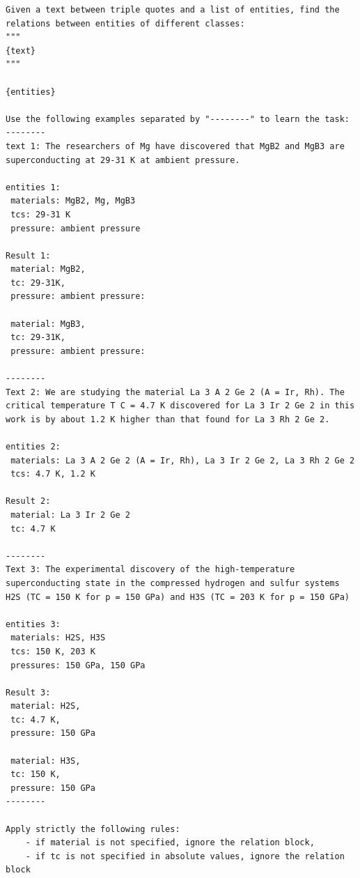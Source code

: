\begin{lstlisting}[caption=Few-shot prompting for extracting relations from lists of entities]
Given a text between triple quotes and a list of entities, find the relations between entities of different classes: 
"""
{text}
"""

{entities}
 
Use the following examples separated by "--------" to learn the task: 
--------
text 1: The researchers of Mg have discovered that MgB2 and MgB3 are superconducting at 29-31 K at ambient pressure.

entities 1:
 materials: MgB2, Mg, MgB3
 tcs: 29-31 K
 pressure: ambient pressure
 
Result 1: 
 material: MgB2, 
 tc: 29-31K, 
 pressure: ambient pressure:
 
 material: MgB3, 
 tc: 29-31K, 
 pressure: ambient pressure:

--------
Text 2: We are studying the material La 3 A 2 Ge 2 (A = Ir, Rh). The critical temperature T C = 4.7 K discovered for La 3 Ir 2 Ge 2 in this work is by about 1.2 K higher than that found for La 3 Rh 2 Ge 2.

entities 2:
 materials: La 3 A 2 Ge 2 (A = Ir, Rh), La 3 Ir 2 Ge 2, La 3 Rh 2 Ge 2
 tcs: 4.7 K, 1.2 K
 
Result 2: 
 material: La 3 Ir 2 Ge 2
 tc: 4.7 K

--------
Text 3: The experimental discovery of the high-temperature superconducting state in the compressed hydrogen and sulfur systems H2S (TC = 150 K for p = 150 GPa) and H3S (TC = 203 K for p = 150 GPa)

entities 3:
 materials: H2S, H3S
 tcs: 150 K, 203 K
 pressures: 150 GPa, 150 GPa
 
Result 3: 
 material: H2S,
 tc: 4.7 K,
 pressure: 150 GPa
 
 material: H3S,
 tc: 150 K,
 pressure: 150 GPa
--------

Apply strictly the following rules:  
    - if material is not specified, ignore the relation block,
    - if tc is not specified in absolute values, ignore the relation block 
\end{lstlisting}


